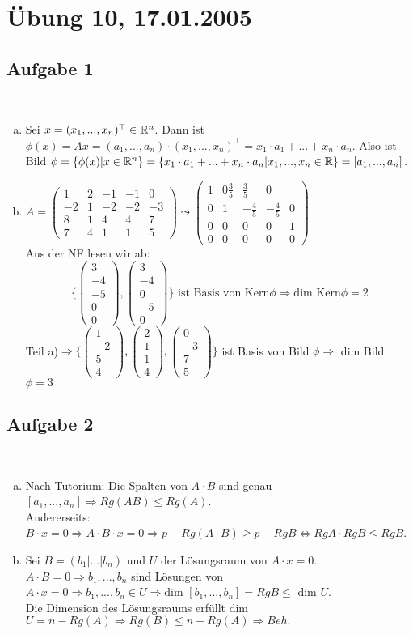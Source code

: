 \documentclass[a4paper,twoside,DIV15,BCOR12mm]{scrbook}
\newcommand{\enua}{\ \begin{enumerate}[a)]}
\newcommand{\une}{\end{enumerate}}
\newcommand{\RA}{\Rightarrow}
\newcommand{\LRA}{\Leftrightarrow}
\newcommand{\x}{\cdot}
\newcommand{\vect}{\begin{pmatrix}}
\newcommand{\tcev}{\end{pmatrix}}
\newcommand{\trans}{^\top}
\providecommand{\matr}[1]{\begin{pmatrix}#1\end{pmatrix}}
\begin{document}
\section {Übung 10, 17.01.2005}
\subsection {Aufgabe 1}
\enua
\item
Sei $x=(x_1, ..., x_n)\trans\in\MdR^n$. Dann ist $\phi(x)=Ax=(a_1, ..., a_n)\x(x_1, ..., x_n)\trans=x_1\x a_1+...+x_n\x a_n$.
Also ist Bild $\phi = \{\phi(x)|x\in\MdR^n\}=\{x_1\x a_1+...+x_n\x a_n|x_1,...,x_n\in\MdR\}=[a_1,...,a_n]$.
\item
$A=\matr{1 & 2 & -1 & -1 & 0\\
-2 & 1 & -2 & -2 & -3\\
8 & 1 & 4 & 4 & 7\\
7 & 4 & 1 & 1 & 5}\leadsto
\matr{1 & 0 \frac35 & \frac35 & 0\\
0 & 1 & -\frac45 & -\frac45 & 0\\
0 & 0 & 0 & 0 & 1\\
0 & 0 & 0 & 0 & 0}$\\
Aus der NF lesen wir ab:
\[\{\vect3\\-4\\-5\\0\\0\tcev,\vect3\\-4\\0\\-5\\0\tcev\}\text{ ist Basis von Kern}\phi\RA\text{dim Kern}\phi=2\]
Teil a)$\RA\{\vect1\\-2\\5\\4\tcev,\vect2\\1\\1\\4\tcev,\vect0\\-3\\7\\5\tcev\}$ ist Basis von Bild $\phi\RA$ dim Bild $\phi=3$
\une
\subsection{Aufgabe 2}
\enua
\item
Nach Tutorium: Die Spalten von $A\x B$ sind genau $[a_1,...,a_n]\RA Rg(AB)\le Rg(A)$.\\
Andererseits: $B\x x=0\RA A\x B\x x=0\RA p-Rg(A\x B)\ge p-Rg B \LRA Rg A\x Rg B\le Rg B$.
\item
Sei $B=(b_1\vert ...\vert b_n)$ und $U$ der Lösungsraum von $A\x x=0.$\\
$A\x B=0\RA b_1,...,b_n$ sind Lösungen von $A\x x=0\RA b_1, ..., b_n\in U\RA \text{dim }[b_1,...,b_n]=Rg B\le\text{ dim }U$.\\
Die Dimension des Lösungsraums erfüllt dim $U=n-Rg(A)\RA Rg(B)\le n-Rg(A)\RA Beh.$
\une
\end{document}
